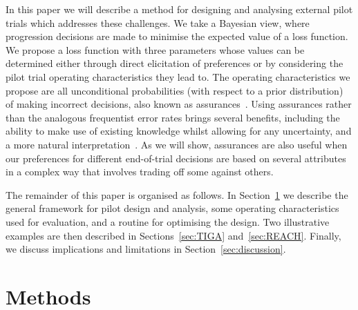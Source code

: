 \documentclass[AMA,STIX1COL]{WileyNJD-v2}
\begin{document}



In this paper we will describe a method for designing and analysing external pilot trials which addresses these challenges. We take a Bayesian view, where progression decisions are made to minimise the expected value of a loss function. We propose a loss function with three parameters whose values can be determined either through direct elicitation of preferences or by considering the pilot trial operating characteristics they lead to. The operating characteristics we propose are all unconditional probabilities (with respect to a prior distribution) of making incorrect decisions, also known as assurances~\cite{OHagan2005}. Using assurances rather than the analogous frequentist error rates brings several benefits, including the ability to make use of existing knowledge whilst allowing for any uncertainty, and a more natural interpretation~\cite{Crisp2018}. As we will show, assurances are also useful when our preferences for different end-of-trial decisions are based on several attributes in a complex way that involves trading off some against others.


The remainder of this paper is organised as follows. In Section~\ref{sec:methods} we describe the general framework for pilot design and analysis, some operating characteristics used for evaluation, and a routine for optimising the design. Two illustrative examples are then described in Sections~\ref{sec:TIGA} and~\ref{sec:REACH}. Finally, we discuss implications and limitations in Section~\ref{sec:discussion}.

\section{Methods}\label{sec:methods}
\end{document}
